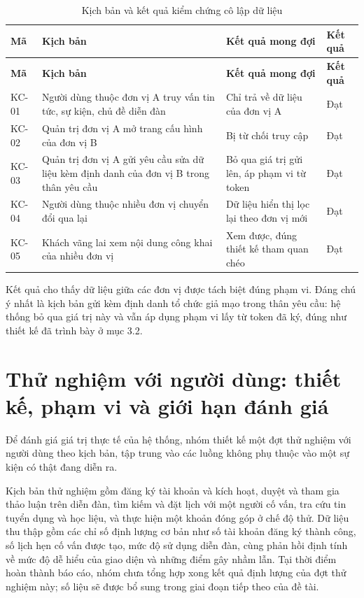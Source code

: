 \documentclass[12pt,a4paper,oneside]{report}
\begin{document}
\renewcommand{\arraystretch}{1.2}
\begin{longtable}{|>{\raggedright\arraybackslash}p{1.6cm}|>{\raggedright\arraybackslash}p{5.6cm}|>{\raggedright\arraybackslash}p{4.4cm}|>{\raggedright\arraybackslash}p{2.6cm}|}
\caption{Kịch bản và kết quả kiểm chứng cô lập dữ liệu}\label{tab:isolation}\\
\hline \textbf{Mã} & \textbf{Kịch bản} & \textbf{Kết quả mong đợi} & \textbf{Kết quả} \\ \hline
\endfirsthead
\hline \textbf{Mã} & \textbf{Kịch bản} & \textbf{Kết quả mong đợi} & \textbf{Kết quả} \\ \hline
\endhead
KC-01 & Người dùng thuộc đơn vị A truy vấn tin tức, sự kiện, chủ đề diễn đàn & Chỉ trả về dữ liệu của đơn vị A & Đạt \\ \hline
KC-02 & Quản trị đơn vị A mở trang cấu hình của đơn vị B & Bị từ chối truy cập & Đạt \\ \hline
KC-03 & Quản trị đơn vị A gửi yêu cầu sửa dữ liệu kèm định danh của đơn vị B trong thân yêu cầu & Bỏ qua giá trị gửi lên, áp phạm vi từ token & Đạt \\ \hline
KC-04 & Người dùng thuộc nhiều đơn vị chuyển đổi qua lại & Dữ liệu hiển thị lọc lại theo đơn vị mới & Đạt \\ \hline
KC-05 & Khách vãng lai xem nội dung công khai của nhiều đơn vị & Xem được, đúng thiết kế tham quan chéo & Đạt \\ \hline
\end{longtable}
\renewcommand{\arraystretch}{1}

Kết quả cho thấy dữ liệu giữa các đơn vị được tách biệt đúng phạm vi. Đáng chú ý nhất là kịch bản gửi kèm định danh tổ chức giả mạo trong thân yêu cầu: hệ thống bỏ qua giá trị này và vẫn áp dụng phạm vi lấy từ token đã ký, đúng như thiết kế đã trình bày ở mục 3.2.

\section{Thử nghiệm với người dùng: thiết kế, phạm vi và giới hạn đánh giá}

Để đánh giá giá trị thực tế của hệ thống, nhóm thiết kế một đợt thử nghiệm với người dùng theo kịch bản, tập trung vào các luồng không phụ thuộc vào một sự kiện có thật đang diễn ra.

Kịch bản thử nghiệm gồm đăng ký tài khoản và kích hoạt, duyệt và tham gia thảo luận trên diễn đàn, tìm kiếm và đặt lịch với một người cố vấn, tra cứu tin tuyển dụng và học liệu, và thực hiện một khoản đóng góp ở chế độ thử. Dữ liệu thu thập gồm các chỉ số định lượng cơ bản như số tài khoản đăng ký thành công, số lịch hẹn cố vấn được tạo, mức độ sử dụng diễn đàn, cùng phản hồi định tính về mức độ dễ hiểu của giao diện và những điểm gây nhầm lẫn. Tại thời điểm hoàn thành báo cáo, nhóm chưa tổng hợp xong kết quả định lượng của đợt thử nghiệm này; số liệu sẽ được bổ sung trong giai đoạn tiếp theo của đề tài.
\end{document}
